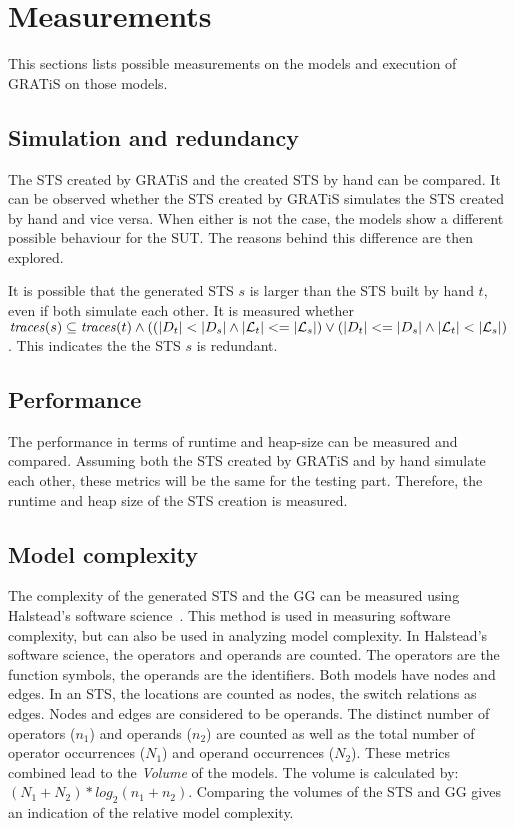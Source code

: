 \section{Measurements}\label{sec:measurements}

This sections lists possible measurements on the models and execution of GRATiS on those models.

\subsection{Simulation and redundancy}
The STS created by GRATiS and the created STS by hand can be compared. It can be observed whether the STS created by GRATiS simulates the STS created by hand and vice versa. When either is not the case, the models show a different possible behaviour for the SUT. The reasons behind this difference are then explored. 

It is possible that the generated STS $s$ is larger than the STS built by hand $t$, even if both simulate each other. It is measured whether $\mathit{traces}(s) \subseteq \mathit{traces}(t) \land ((|D_t| < |D_s| \land |\mathcal{L}_t| <= |\mathcal{L}_s|) \lor (|D_t| <= |D_s| \land |\mathcal{L}_t| < |\mathcal{L}_s|)$. This indicates the the STS $s$ is redundant.

\subsection{Performance}
The performance in terms of runtime and heap-size can be measured and compared. Assuming both the STS created by GRATiS and by hand simulate each other, these metrics will be the same for the testing part. Therefore, the runtime and heap size of the STS creation is measured.

\subsection{Model complexity}\label{sec:complexity_measurement}
The complexity of the generated STS and the GG can be measured using Halstead's software science~\cite{Halstead:software-science}. This method is used in measuring software complexity, but can also be used in analyzing model complexity. In Halstead's software science, the operators and operands are counted. The operators are the function symbols, the operands are the identifiers. Both models have nodes and edges. In an STS, the locations are counted as nodes, the switch relations as edges. Nodes and edges are considered to be operands. The distinct number of operators ($n_1$) and operands ($n_2$) are counted as well as the total number of operator occurrences ($N_1$) and operand occurrences ($N_2$). These metrics combined lead to the \textit{Volume} of the models. The volume is calculated by: $(N_1+N_2)*\mathit{log}_2(n_1+n_2)$. Comparing the volumes of the STS and GG gives an indication of the relative model complexity.

